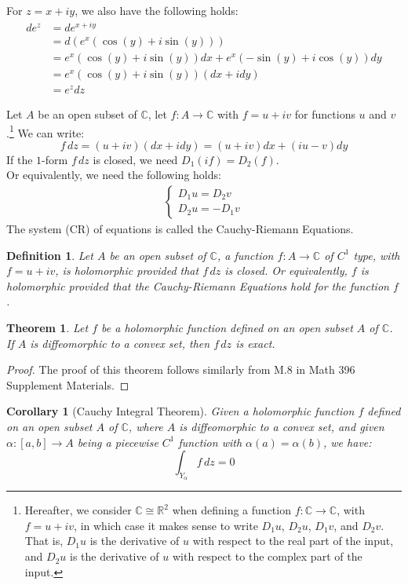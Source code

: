 \documentclass[15pt]{book}
\theoremstyle{break}
\theoremstyle{break}
\newtheorem{thm}{Theorem}[section]
\newtheorem{corT}[lem]{Corollary}
\newtheorem{defn}{Definition}[corL]
\newcommand{\R}{\mathbb{R}}
\newcommand{\Complex}{\mathbb{C}}
\begin{document}
For $z=x+iy$, we also have the following holds:
\begin{align*}
de^z &= de^{x+iy}\\
&= d(e^x(\cos(y)+i\sin(y))) \\
&= e^x(\cos(y)+i\sin(y))dx + e^x(-\sin(y)+i\cos(y))dy \\
&= e^x(\cos(y) + i\sin(y)) (dx+idy)\\
&= e^z dz
\end{align*}

Let $A$ be an open subset of $\Complex$, let $f:A \to \Complex$ with $f = u+iv$ for functions $u$ and $v$.\footnote{Hereafter, we consider $\Complex \cong \R^2$ when defining a function $f:\Complex\to\Complex$, with $f=u+iv$, in which case it makes sense to write $D_1u$, $D_2u$, $D_1v$, and $D_2 v$. That is, $D_1u$ is the derivative of $u$ with respect to the real part of the input, and $D_2u$ is the derivative of $u$ with respect to the complex part of the input.} We can write:
$$f\, dz = (u+iv)(dx+idy) = (u+iv)dx+(iu-v) dy$$
If the $1$-form $f\, dz$ is closed, we need $D_1(if) = D_2(f)$. \\
Or equivalently, we need the following holds:
\begin{align*}
\begin{cases}
D_1 u = D_2 v\\
D_2 u = -D_1 v
\end{cases}
\tag{CR}
\end{align*}
The system (CR) of equations is called the Cauchy-Riemann Equations.

\begin{defn}
Let $A$ be an open subset of $\Complex$, a function $f:A \to \Complex$ of $C^1$ type, with $f = u+iv$, is holomorphic provided that $f\, dz$ is closed. Or equivalently, $f$ is holomorphic provided that the Cauchy-Riemann Equations hold for the function $f$. 
\end{defn}


\begin{thm}
Let $f$ be a holomorphic function defined on an open subset $A$ of $\Complex$. \\
If $A$ is diffeomorphic to a convex set, then $f\, dz$ is exact.
\end{thm}
\begin{proof}
The proof of this theorem follows similarly from M.8 in Math 396 Supplement Materials.
\end{proof}

\begin{corT}[Cauchy Integral Theorem]
Given a holomorphic function $f$ defined on an open subset $A$ of $\Complex$, where $A$ is diffeomorphic to a convex set, and given $\alpha:[a,b] \to A$ being a piecewise $C^1$ function with $\alpha(a) = \alpha(b)$, we have: $$\int_{Y_\alpha} f\, dz = 0$$
\end{corT}
\end{document}
